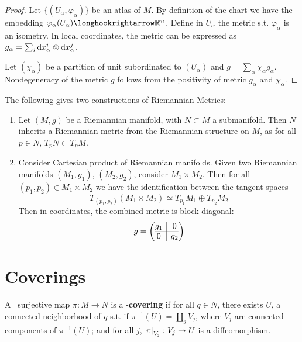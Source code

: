 \documentclass{article}
\begin{document}
\begin{proof}
    Let $\{ (U_{\alpha}, \varphi_{\alpha}) \}$ be an atlas of $M$. By definition of the chart we have the embedding $\varphi_{\alpha} (U_{\alpha}) \longhookrightarrow \R^n$. Define in $U_{\alpha}$ the metric s.t. $\varphi_{\alpha}$ is an isometry. In local coordinates, the metric can be expressed as $g_{\alpha} = \sum_{i} \mathrm{d} x_{\alpha}^i \otimes \mathrm{d} x_{\alpha}^j$.

    Let $(\chi_{\alpha})$ be a partition of unit subordinated to $(U_{\alpha})$ and $g = \sum_{\alpha} \chi_{\alpha} g_{\alpha}$. Nondegeneracy of the metric $g$ follows from the positivity of metric $g_{\alpha}$ and $\chi_{\alpha}$.
\end{proof}

\begin{example}
    The following gives two constructions of Riemannian Metrics:
    \begin{enumerate}[label=\arabic*)]
        \item Let $(M, g)$ be a Riemannian manifold, with $N \subset M$ a submanifold. Then $N$ inherits a Riemannian metric from the Riemannian structure on $M$, as for all $p \in N$, $T_p N \subset T_p M$.
        \item Consider Cartesian product of Riemannian manifolds. Given two Riemannian manifolds $(M_1, g_1)$, $(M_2, g_2)$, consider $M_1 \times M_2$. Then for all $(p_1, p_2) \in M_1 \times M_2$ we have the identification between the tangent spaces 
        \[
            T_{(p_1, p_2)} (M_1 \times M_2) \simeq T_{p_1} M_1 \oplus T_{p_2} M_2
        \]
        Then in coordinates, the combined metric is block diagonal: 
        \[
            g = \left(\begin{array}{@{}c|c@{}}
                g_1 & 0 \\\hline
                0 & g_2 \\
                \end{array}\right)
        \]
    \end{enumerate}
\end{example}

\section{Coverings}

\begin{definition}[Covering]
    A \smooth\ surjective map $\pi: M \to N$ is a \smooth-\textbf{covering} if for all $q \in N$, there exists $U$, a connected neighborhood of $q$ s.t. if $\pi^{-1}(U) = \amalg_{j} V_j$, where $V_j$ are connected components of $\pi^{-1}(U)$; and for all $j$, $\left.\pi\right|_{V_j}: V_j \to U$ is a diffeomorphism.
\end{definition}
\end{document}
